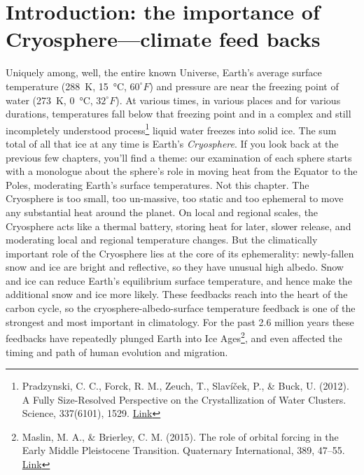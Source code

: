 \documentclass[amstex,12pt]{book}
\begin{document}
\section{Introduction: the importance of Cryosphere---climate feed backs}
Uniquely among, well, the entire known Universe, Earth's average surface temperature (\SI{288}{\kelvin}, \SI{15}{\celsius}, $60^{\circ}F$) and pressure are near the freezing point of water (\SI{273}{\kelvin}, \SI{0}{\celsius}, $32^{\circ}F$). At various times, in various places and for various durations, temperatures fall below that freezing point and in a complex and still incompletely understood process\footnote{Pradzynski, C. C., Forck, R. M., Zeuch, T., Slavíček, P., \& Buck, U. (2012). A Fully Size-Resolved Perspective on the Crystallization of Water Clusters. Science, 337(6101), 1529. \href{https://doi.org/10.1126/science.1225468}{Link}} liquid water freezes into solid ice. The sum total of all that ice at any time is Earth's \emph{Cryosphere}. If you look back at the previous few chapters, you'll find a theme: our examination of each sphere starts with a monologue about the sphere's role in moving heat from the Equator to the Poles, moderating Earth's surface temperatures. Not this chapter. The Cryosphere is too small, too un-massive, too static and too ephemeral to move any substantial heat around the planet. On local and regional scales, the Cryosphere acts like a thermal battery, storing heat for later, slower release, and moderating local and regional temperature changes. But the climatically important role of the Cryosphere lies at the core of its ephemerality: newly-fallen snow and ice are bright and reflective, so they have unusual high albedo. Snow and ice can reduce Earth's equilibrium surface temperature, and hence make the additional snow and ice more likely. These feedbacks reach into the heart of the carbon cycle, so the cryosphere-albedo-surface temperature feedback is one of the strongest and most important in climatology. For the past 2.6 million years these feedbacks have repeatedly plunged Earth into Ice Ages\footnote{Maslin, M. A., \& Brierley, C. M. (2015). The role of orbital forcing in the Early Middle Pleistocene Transition. Quaternary International, 389, 47–55. \href{https://doi.org/10.1016/j.quaint.2015.01.047}{Link}}, and even affected the timing and path of human evolution and migration.\\
\end{document}
